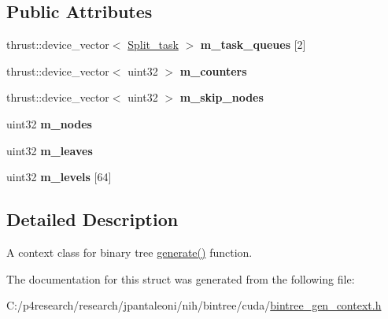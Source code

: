 \subsection*{\-Public \-Attributes}
\begin{DoxyCompactItemize}
\item 
\hypertarget{structnih_1_1cuda_1_1_bintree__gen__context_a26408efc7e295c303bb1faf54dda5556}{
thrust\-::device\-\_\-vector$<$ \hyperlink{structnih_1_1cuda_1_1_bintree__gen__context_1_1_split__task}{\-Split\-\_\-task} $>$ {\bfseries m\-\_\-task\-\_\-queues} \mbox{[}2\mbox{]}}
\label{structnih_1_1cuda_1_1_bintree__gen__context_a26408efc7e295c303bb1faf54dda5556}

\item 
\hypertarget{structnih_1_1cuda_1_1_bintree__gen__context_ae7d5e70aa5a11ddc573e3f1defab2ad6}{
thrust\-::device\-\_\-vector$<$ uint32 $>$ {\bfseries m\-\_\-counters}}
\label{structnih_1_1cuda_1_1_bintree__gen__context_ae7d5e70aa5a11ddc573e3f1defab2ad6}

\item 
\hypertarget{structnih_1_1cuda_1_1_bintree__gen__context_aad5723ca83eb42272f52e76dc00e68cf}{
thrust\-::device\-\_\-vector$<$ uint32 $>$ {\bfseries m\-\_\-skip\-\_\-nodes}}
\label{structnih_1_1cuda_1_1_bintree__gen__context_aad5723ca83eb42272f52e76dc00e68cf}

\item 
\hypertarget{structnih_1_1cuda_1_1_bintree__gen__context_afb4526ed7429a12e59f4f2c40881c1c8}{
uint32 {\bfseries m\-\_\-nodes}}
\label{structnih_1_1cuda_1_1_bintree__gen__context_afb4526ed7429a12e59f4f2c40881c1c8}

\item 
\hypertarget{structnih_1_1cuda_1_1_bintree__gen__context_a11b983b19b3c56c85c7e7260f5877a21}{
uint32 {\bfseries m\-\_\-leaves}}
\label{structnih_1_1cuda_1_1_bintree__gen__context_a11b983b19b3c56c85c7e7260f5877a21}

\item 
\hypertarget{structnih_1_1cuda_1_1_bintree__gen__context_a54ee7cbc8971257667e450f2dc45ce8d}{
uint32 {\bfseries m\-\_\-levels} \mbox{[}64\mbox{]}}
\label{structnih_1_1cuda_1_1_bintree__gen__context_a54ee7cbc8971257667e450f2dc45ce8d}

\end{DoxyCompactItemize}


\subsection{\-Detailed \-Description}
\-A context class for binary tree \hyperlink{group__bintree_gad76a50ae08ab4d525f748a7cbcc0fb6e}{generate()} function. 

\-The documentation for this struct was generated from the following file\-:\begin{DoxyCompactItemize}
\item 
\-C\-:/p4research/research/jpantaleoni/nih/bintree/cuda/\hyperlink{bintree__gen__context_8h}{bintree\-\_\-gen\-\_\-context.\-h}\end{DoxyCompactItemize}
